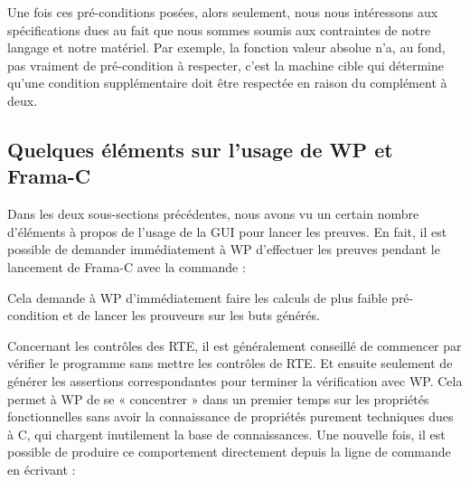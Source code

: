 \documentclass[12pt,francais,]{scrbook}
\newenvironment{Shaded}{}{}
\newcommand{\KeywordTok}[1]{\textcolor[rgb]{0.00,0.44,0.13}{\textbf{{#1}}}}
\newcommand{\NormalTok}[1]{{#1}}
\begin{document}
Une fois ces pré-conditions posées, alors seulement, nous nous
intéressons aux spécifications dues au fait que nous sommes soumis aux
contraintes de notre langage et notre matériel. Par exemple, la fonction
valeur absolue n'a, au fond, pas vraiment de pré-condition à respecter,
c'est la machine cible qui détermine qu'une condition supplémentaire
doit être respectée en raison du complément à deux.

\subsection{Quelques éléments sur l'usage de WP et
Frama-C}\label{quelques-uxe9luxe9ments-sur-lusage-de-wp-et-frama-c}

Dans les deux sous-sections précédentes, nous avons vu un certain nombre
d'éléments à propos de l'usage de la GUI pour lancer les preuves. En
fait, il est possible de demander immédiatement à WP d'effectuer les
preuves pendant le lancement de Frama-C avec la commande :

\begin{footnotesize}\begin{Shaded}
\end{Shaded}\end{footnotesize}

Cela demande à WP d'immédiatement faire les calculs de plus faible
pré-condition et de lancer les prouveurs sur les buts générés.

Concernant les contrôles des RTE, il est généralement conseillé de
commencer par vérifier le programme sans mettre les contrôles de RTE. Et
ensuite seulement de générer les assertions correspondantes pour
terminer la vérification avec WP. Cela permet à WP de se « concentrer »
dans un premier temps sur les propriétés fonctionnelles sans avoir la
connaissance de propriétés purement techniques dues à C, qui chargent
inutilement la base de connaissances. Une nouvelle fois, il est possible
de produire ce comportement directement depuis la ligne de commande en
écrivant :

\begin{footnotesize}\begin{Shaded}
\end{Shaded}\end{footnotesize}
\end{document}
